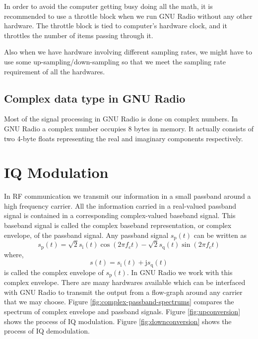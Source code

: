 \documentclass[a4paper,10pt]{article}
\begin{document}
In order to avoid the computer getting busy doing all the math, it is recommended to use a throttle block
when we run GNU Radio without any other hardware. The throttle block is tied to computer's hardware clock,
and it throttles the number of items passing through it.

Also when we have hardware involving different sampling rates, we might have to use some up-sampling/down-sampling
so that we meet the sampling rate requirement of all the hardwares.
\subsection{Complex data type in GNU Radio}
Most of the signal processing in GNU Radio is done on complex numbers.
In GNU Radio a complex number occupies 8 bytes in memory.
It actually consists of two 4-byte floats representing the real and imaginary components respectively.

\section{IQ Modulation\cite{bib:madhov}}
In RF communication we transmit our information in a small passband around a high frequency carrier.
All the information carried in a real-valued passband signal is contained in a corresponding complex-valued baseband signal. 
This baseband signal is called the complex baseband representation, or complex envelope, of the passband signal.
Any passband signal $s_{\text{p}}(t)$ can be written as
\begin{equation}
 s_{\text{p}}(t) = \sqrt{2}s_{\text{i}}(t)\operatorname{cos}(2\pi f_ct) - \sqrt{2}s_{\text{q}}(t)\operatorname{sin}(2\pi f_ct)
\end{equation}
where,
\begin{equation}
 s(t) = s_{\text{i}}(t) + \text{j}s_{\text{q}}(t)
\end{equation}
is called the complex envelope of $s_{\text{p}}(t)$. In GNU Radio we work with this complex envelope.
There are many hardwares available which can be interfaced with GNU Radio to transmit the output from a flow-graph
around any carrier that we may choose. Figure \ref{fig:complex-passband-spectrums} compares the spectrum of 
complex envelope and passband signals. Figure \ref{fig:upconversion} shows the process of IQ modulation.
Figure \ref{fig:downconversion} shows the process of IQ demodulation.
\end{document}

